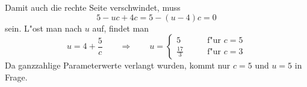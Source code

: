 \begin{loesung}
Damit auch die rechte Seite verschwindet, muss
\[
5-uc+4c=5-(u-4)c=0
\]
sein.
L"ost man nach $u$ auf, findet man
\[
u=4+\frac{5}{c}
\qquad\Rightarrow\qquad
u=\begin{cases}
5&\qquad\text{f"ur $c=5$}\\
\frac{17}{3}&\qquad\text{f"ur $c=3$}
\end{cases}
\]
Da ganzzahlige Parameterwerte verlangt wurden, kommt nur $c=5$ und $u=5$
in Frage.
\end{loesung}

\begin{bewertung}
\end{bewertung}



